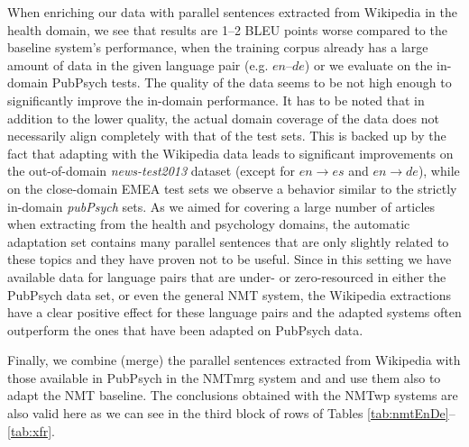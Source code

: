 \documentclass[a4paper,11pt]{article}
\newcommand{\en}{$en$}
\newcommand{\de}{$de$}
\begin{document}
When enriching our data with parallel sentences extracted from Wikipedia in the health domain, we see that results are 1--2 BLEU points worse compared to the baseline system's performance, when the training corpus already has a large amount of data in the given language pair (e.g. \en--\de) or we evaluate on the in-domain PubPsych tests.
The quality of the data seems to be not high enough to significantly improve the in-domain performance. It has to be noted that in addition to the lower quality, the actual domain coverage of the data does not necessarily align completely with that of the test sets. This is backed up by the fact that adapting with the Wikipedia data leads to significant improvements on the out-of-domain \textit{news-test2013} dataset (except for $en\rightarrow es$ and $en\rightarrow de$), while on the close-domain EMEA test sets we observe a behavior similar to the strictly in-domain \textit{pubPsych} sets. As we aimed for covering a large number of articles when extracting from the health and psychology domains, the automatic adaptation set contains many parallel sentences that are only slightly related to these topics and they have proven not to be useful.
Since in this setting we have available data for language pairs that are under- or zero-resourced in either the PubPsych data set, or even the general NMT system, the Wikipedia extractions have a clear positive effect for these language pairs and the adapted systems often outperform the ones that have been adapted on PubPsych data. 

Finally, we combine (merge) the parallel sentences extracted from Wikipedia with those available in PubPsych in the NMTmrg system and and use them also to adapt the NMT baseline.  The conclusions obtained with the NMTwp systems are also valid here as we can see in the third block of rows of Tables \ref{tab:nmtEnDe}--\ref{tab:xfr}.

\end{document}
